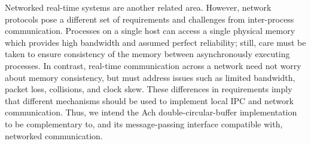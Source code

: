 \documentclass[letterpaper]{IEEEtran}
\begin{document}
Networked real-time systems are another related area. However, network
protocols pose a different set of requirements and challenges from
inter-process communication.  Processes on a single host can access a
single physical memory which provides high bandwidth and assumed
perfect reliability; still, care must be taken to ensure consistency
of the memory between asynchronously executing processes. In contrast,
real-time communication across a network need not worry about memory
consistency, but must address issues such as limited bandwidth, packet
loss, collisions, and clock skew.  These differences in requirements
imply that different mechanisms should be used to implement local IPC
and network communication.  Thus, we intend the Ach
double-circular-buffer implementation to be complementary to, and its
message-passing interface compatible with, networked communication.




\end{document}
